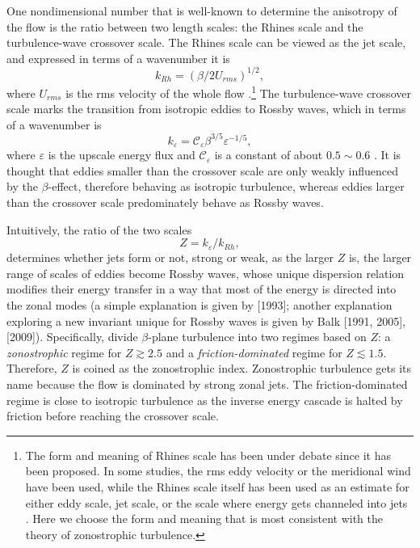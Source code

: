 \documentclass{jfm}
\begin{document}
One nondimensional number that is well-known to determine the anisotropy
of the flow is the ratio between two length scales: the Rhines scale
and the turbulence-wave crossover scale. The Rhines scale
can be viewed as the jet scale, and expressed in terms of a wavenumber it is
\begin{equation}
    k_{Rh}=(\beta/2U_{rms})^{1/2},\label{eq:Rhines_wavenumber_beta_Urms}
\end{equation}
where $U_{rms}$ is the rms velocity of the whole flow \citep{Rhines1975}.\footnote{
The form and meaning of Rhines scale has been under debate since it has been proposed.
In some studies, the rms eddy velocity or the meridional wind have been used, while the Rhines scale itself
has been used as an estimate for either eddy scale, jet scale, or
the scale where energy gets channeled into jets \citep{Williams1978,Jansen2012,Chai2014,Liu2015,Chemke2015}.
Here we choose the form and meaning that is most consistent 
with the theory of zonostrophic turbulence.}
The turbulence-wave crossover scale marks the transition from
isotropic eddies to Rossby waves, which in terms of a wavenumber is
\begin{equation}
    k_{\varepsilon}=\mathcal{C}_{\varepsilon}\beta^{3/5}\varepsilon^{-1/5},\label{eq:classical_crossover_wavenumber}
\end{equation}
where $\varepsilon$ is the upscale energy flux and $\mathcal{C}_{\varepsilon}$ is a constant of about
$0.5\sim0.6$ \citep{Vallis1993,Galperin2010,Smith2002}. It is thought that
eddies smaller than the crossover scale are only weakly influenced by the 
$\beta$-effect, therefore behaving as isotropic turbulence, whereas eddies 
larger than the crossover scale predominately behave as Rossby waves.

Intuitively, the ratio of the two scales
\begin{equation}
    Z=k_{\varepsilon}/k_{Rh},\label{eq:zonostrophic_index_def}
\end{equation}
determines whether jets form or not, strong or weak, as the larger
$Z$ is, the larger range of scales of eddies become Rossby waves, whose
unique dispersion relation modifies their energy transfer in a way 
that most of the energy is directed into the zonal modes (a simple explanation 
is given by \citeauthor{Vallis1993}
{[}1993{]}; another explanation exploring a new invariant unique for
Rossby waves is given by \nocite{Balk1991,Balk2005}Balk {[}1991,
2005{]}, \citeauthor{Nazarenko2009} {[}2009{]}).
Specifically, \citet{Galperin2010}
divide $\beta$-plane turbulence into two regimes based on $Z$: 
a \textit{zonostrophic} regime for $Z\gtrsim2.5$ and 
a \textit{friction-dominated} regime for $Z\lesssim1.5$. 
Therefore, $Z$ is coined as the zonostrophic index. 
Zonostrophic turbulence gets its name because the flow
is dominated by strong zonal jets. The friction-dominated
regime is close to isotropic turbulence as the inverse energy cascade
is halted by friction before reaching the crossover scale.
\end{document}
